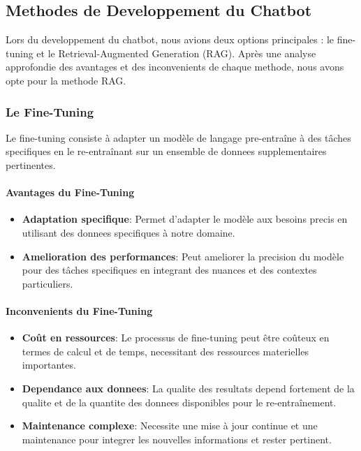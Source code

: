 \subsection{Methodes de Developpement du Chatbot}
Lors du developpement du chatbot, nous avions deux options principales : le fine-tuning et le Retrieval-Augmented Generation (RAG). Après une analyse approfondie des avantages et des inconvenients de chaque methode, nous avons opte pour la methode RAG.

\subsubsection{Le Fine-Tuning}
Le fine-tuning consiste à adapter un modèle de langage pre-entraîne à des tâches specifiques en le re-entraînant sur un ensemble de donnees supplementaires pertinentes.

\paragraph{Avantages du Fine-Tuning}
\begin{itemize}
    \item \textbf{Adaptation specifique}: Permet d'adapter le modèle aux besoins precis en utilisant des donnees specifiques à notre domaine.
    \item \textbf{Amelioration des performances}: Peut ameliorer la precision du modèle pour des tâches specifiques en integrant des nuances et des contextes particuliers.
\end{itemize}

\paragraph{Inconvenients du Fine-Tuning}
\begin{itemize}
    \item \textbf{Coût en ressources}: Le processus de fine-tuning peut être coûteux en termes de calcul et de temps, necessitant des ressources materielles importantes.
    \item \textbf{Dependance aux donnees}: La qualite des resultats depend fortement de la qualite et de la quantite des donnees disponibles pour le re-entraînement.
    \item \textbf{Maintenance complexe}: Necessite une mise à jour continue et une maintenance pour integrer les nouvelles informations et rester pertinent.
\end{itemize}

